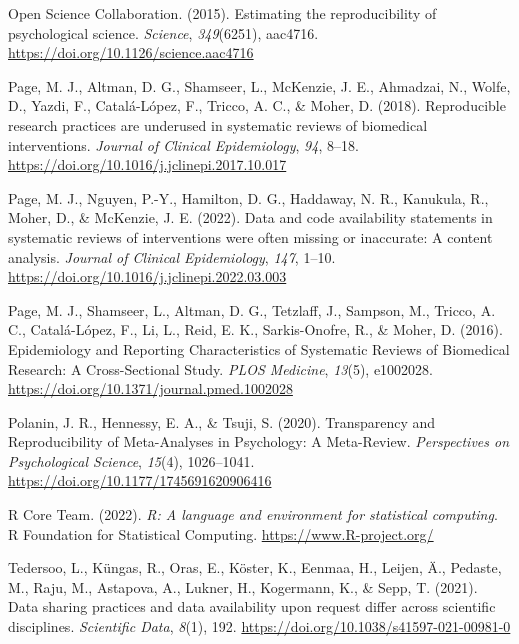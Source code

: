 \documentclass[
  ,jou, a4paper,floatsintext]{apa6}
\newlength{\cslhangindent}
\newlength{\cslentryspacingunit} %
\newenvironment{CSLReferences}[2] %
 {%
  \setlength{\parindent}{0pt}
  \ifodd #1
  \let\oldpar\par
  \def\par{\hangindent=\cslhangindent\oldpar}
  \fi
  \setlength{\parskip}{#2\cslentryspacingunit}
 }%
 {}
\begin{document}
\begin{CSLReferences}{1}{0}
\leavevmode{}%
Open Science Collaboration. (2015). Estimating the reproducibility of psychological science. \emph{Science}, \emph{349}(6251), aac4716. \url{https://doi.org/10.1126/science.aac4716}

\leavevmode{}%
Page, M. J., Altman, D. G., Shamseer, L., McKenzie, J. E., Ahmadzai, N., Wolfe, D., Yazdi, F., Catalá-López, F., Tricco, A. C., \& Moher, D. (2018). Reproducible research practices are underused in systematic reviews of biomedical interventions. \emph{Journal of Clinical Epidemiology}, \emph{94}, 8--18. \url{https://doi.org/10.1016/j.jclinepi.2017.10.017}

\leavevmode{}%
Page, M. J., Nguyen, P.-Y., Hamilton, D. G., Haddaway, N. R., Kanukula, R., Moher, D., \& McKenzie, J. E. (2022). Data and code availability statements in systematic reviews of interventions were often missing or inaccurate: A content analysis. \emph{Journal of Clinical Epidemiology}, \emph{147}, 1--10. \url{https://doi.org/10.1016/j.jclinepi.2022.03.003}

\leavevmode{}%
Page, M. J., Shamseer, L., Altman, D. G., Tetzlaff, J., Sampson, M., Tricco, A. C., Catalá-López, F., Li, L., Reid, E. K., Sarkis-Onofre, R., \& Moher, D. (2016). Epidemiology and {Reporting} {Characteristics} of {Systematic} {Reviews} of {Biomedical} {Research}: {A} {Cross}-{Sectional} {Study}. \emph{PLOS Medicine}, \emph{13}(5), e1002028. \url{https://doi.org/10.1371/journal.pmed.1002028}

\leavevmode{}%
Polanin, J. R., Hennessy, E. A., \& Tsuji, S. (2020). Transparency and {Reproducibility} of {Meta-Analyses} in {Psychology}: {A Meta-Review}. \emph{Perspectives on Psychological Science}, \emph{15}(4), 1026--1041. \url{https://doi.org/10.1177/1745691620906416}

\leavevmode{}%
R Core Team. (2022). \emph{R: A language and environment for statistical computing}. R Foundation for Statistical Computing. \url{https://www.R-project.org/}

\leavevmode{}%
Tedersoo, L., Küngas, R., Oras, E., Köster, K., Eenmaa, H., Leijen, Ä., Pedaste, M., Raju, M., Astapova, A., Lukner, H., Kogermann, K., \& Sepp, T. (2021). Data sharing practices and data availability upon request differ across scientific disciplines. \emph{Scientific Data}, \emph{8}(1), 192. \url{https://doi.org/10.1038/s41597-021-00981-0}


\end{CSLReferences}
\end{document}

